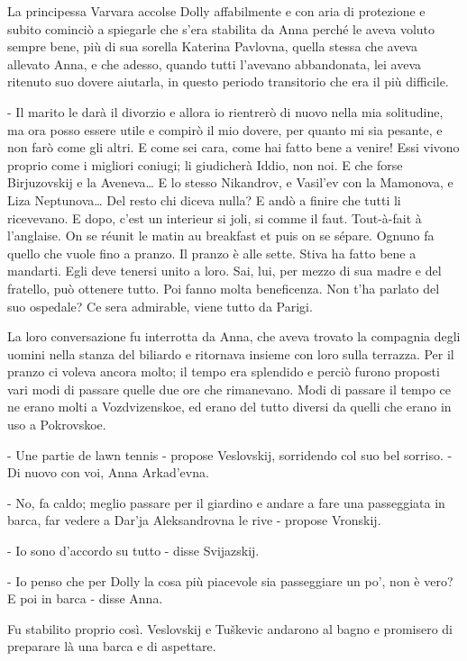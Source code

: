 La principessa Varvara accolse Dolly affabilmente e con aria di protezione e subito cominciò a spiegarle che s'era stabilita da Anna perché le aveva voluto sempre bene, più di sua sorella Katerina Pavlovna, quella stessa che aveva allevato Anna, e che adesso, quando tutti l'avevano abbandonata, lei aveva ritenuto suo dovere aiutarla, in questo periodo transitorio che era il più difficile. 

- Il marito le darà il divorzio e allora io rientrerò di nuovo nella mia solitudine, ma ora posso essere utile e compirò il mio dovere, per quanto mi sia pesante, e non farò come gli altri. E come sei cara, come hai fatto bene a venire! Essi vivono proprio come i migliori coniugi; li giudicherà Iddio, non noi. E che forse Birjuzovskij e la Aveneva\ldots{} E lo stesso Nikandrov, e Vasil'ev con la Mamonova, e Liza Neptunova\ldots{} Del resto chi diceva nulla? E andò a finire che tutti li ricevevano. E dopo, c'est un interieur si joli, si comme il faut. Tout-à-fait à l'anglaise. On se réunit le matin au breakfast et puis on se sépare. Ognuno fa quello che vuole fino a pranzo. Il pranzo è alle sette. Stiva ha fatto bene a mandarti. Egli deve tenersi unito a loro. Sai, lui, per mezzo di sua madre e del fratello, può ottenere tutto. Poi fanno molta beneficenza. Non t'ha parlato del suo ospedale? Ce sera admirable, viene tutto da Parigi. 

La loro conversazione fu interrotta da Anna, che aveva trovato la compagnia degli uomini nella stanza del biliardo e ritornava insieme con loro sulla terrazza. Per il pranzo ci voleva ancora molto; il tempo era splendido e perciò furono proposti vari modi di passare quelle due ore che rimanevano. Modi di passare il tempo ce ne erano molti a Vozdvizenskoe, ed erano del tutto diversi da quelli che erano in uso a Pokrovskoe. 

- Une partie de lawn tennis - propose Veslovskij, sorridendo col suo bel sorriso. - Di nuovo con voi, Anna Arkad'evna. 

- No, fa caldo; meglio passare per il giardino e andare a fare una passeggiata in barca, far vedere a Dar'ja Aleksandrovna le rive - propose Vronskij. 

- Io sono d'accordo su tutto - disse Svijazskij. 

- Io penso che per Dolly la cosa più piacevole sia passeggiare un po', non è vero? E poi in barca - disse Anna. 

Fu stabilito proprio così. Veslovskij e Tuškevic andarono al bagno e promisero di preparare là una barca e di aspettare. 


